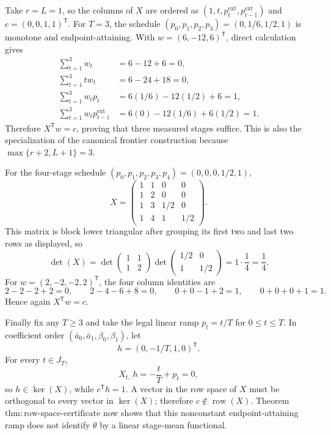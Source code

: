 Take \(r=L=1\), so the columns of \(X\) are ordered as \((1,t,p_t^{\mathrm{ext}},p_{t-1}^{\mathrm{ext}})\) and \(c=(0,0,1,1)^{\mathsf T}\).  For \(T=3\), the schedule \((p_0,p_1,p_2,p_3)=(0,1/6,1/2,1)\) is monotone and endpoint-attaining.  With \(w=(6,-12,6)^{\mathsf T}\), direct calculation gives
\[
\begin{aligned}
 \sum_{t=1}^{3}w_t&=6-12+6=0,\\
 \sum_{t=1}^{3}tw_t&=6-24+18=0,\\
 \sum_{t=1}^{3}w_tp_t&=6(1/6)-12(1/2)+6=1,\\
 \sum_{t=1}^{3}w_tp_{t-1}^{\mathrm{ext}}&=6(0)-12(1/6)+6(1/2)=1.
\end{aligned}
\]
Therefore \(X^{\mathsf T}w=c\), proving that three measured stages suffice.  This is also the specialization of the canonical frontier construction because \(\max\{r+2,L+1\}=3\).

For the four-stage schedule \((p_0,p_1,p_2,p_3,p_4)=(0,0,0,1/2,1)\),
\[
 X=
 \begin{pmatrix}
 1&1&0&0\\
 1&2&0&0\\
 1&3&1/2&0\\
 1&4&1&1/2
 \end{pmatrix}.
\]
This matrix is block lower triangular after grouping its first two and last two rows as displayed, so
\[
 \det(X)
 =\det\!\begin{pmatrix}1&1\\1&2\end{pmatrix}
  \det\!\begin{pmatrix}1/2&0\\1&1/2\end{pmatrix}
 =1\cdot\frac14=\frac14.
\]
For \(w=(2,-2,-2,2)^{\mathsf T}\), the four column identities are
\[
 2-2-2+2=0,\qquad
 2-4-6+8=0,\qquad
 0+0-1+2=1,\qquad
 0+0+0+1=1.
\]
Hence again \(X^{\mathsf T}w=c\).

Finally fix any \(T\ge3\) and take the legal linear ramp \(p_t=t/T\) for \(0\le t\le T\).  In coefficient order \((\bar a_0,\bar a_1,\beta_0,\beta_1)\), let
\[
 h=(0,-1/T,1,0)^{\mathsf T}.
\]
For every \(t\in J_T\),
\[
 X_{t,\cdot}h=-\frac{t}{T}+p_t=0,
\]
so \(h\in\ker(X)\), while \(c^{\mathsf T}h=1\).  A vector in the row space of \(X\) must be orthogonal to every vector in \(\ker(X)\); therefore \(c\notin\operatorname{row}(X)\).  Theorem \(\mathrm{thm:row\text{-}space\text{-}certificate}\) now shows that this nonconstant endpoint-attaining ramp does not identify \(\theta\) by a linear stage-mean functional.